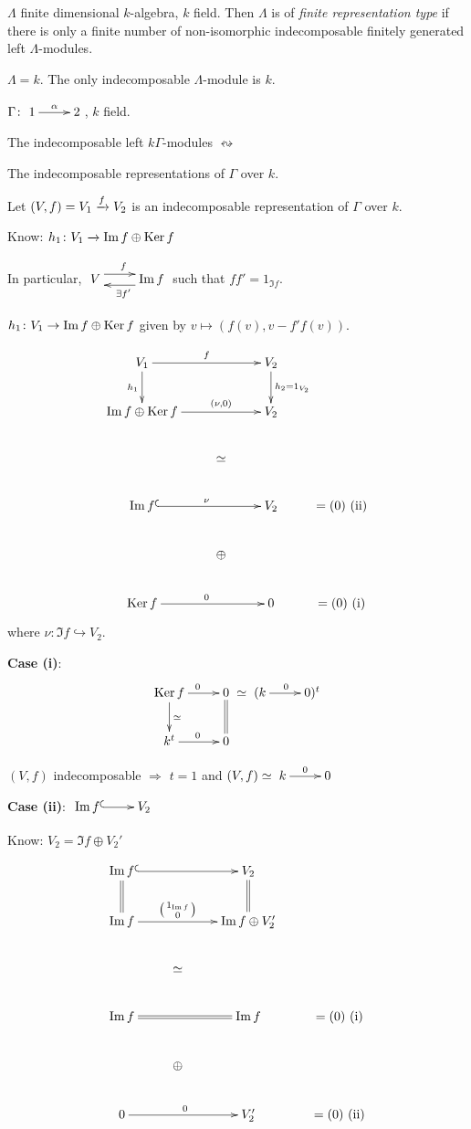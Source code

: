 \begin{defin}
$\Lambda$ finite dimensional $k$-algebra, $k$ field.  Then $\Lambda$
is of \emph{finite representation type} if there is only a finite number of non-isomorphic
indecomposable finitely generated left $\Lambda$-modules.
\end{defin}

\begin{exam}
$\Lambda = k$.  The only indecomposable $\Lambda$-module is $k$. 
\end{exam}

\begin{exam}
$\Gamma\colon \xymatrix{1\ar[r]^\alpha & 2}$, $k$ field.

The indecomposable left $k\Gamma$-modules $\leftrightsquigarrow$ \parbox{6cm}{The
indecomposable representations of $\Gamma$ over $k$.} 

Let $(V,f) = V_1\xrightarrow{f} V_2$ is an indecomposable representation of
$\Gamma$ over $k$.

Know: $h_1\colon V_1 \xrightarrow{~} \operatorname{Im}\nolimits f\oplus \operatorname{Ker}\nolimits f$

In particular, $\xymatrix{V\ar@<1ex>[r]^f & \Im f\ar@<1ex>[l]^{\exists
    f'}}$
such that $ff' = 1_{\Im f}$.

$h_1\colon V_1 \to \operatorname{Im}\nolimits f \oplus \operatorname{Ker}\nolimits f$ given by $v\mapsto (f(v), v -
f'f(v))$. 

\[\xymatrix{
V_1 \ar[rr]^f \ar[d]_{h_1} & &  V_2\ar[d]^{h_2=1_{V_2}} & \\
\Im f\oplus \Ker f \ar[rr]^-{(\nu,0)} & & V_2 & \\
& \simeq & & \\
\Im f\ar@{^(->}[rr]^\nu && V_2 & =(0) \text{\ (ii)}\\
 & \oplus & \\
\Ker f \ar[rr]^0 && 0 & = (0) \text{\ (i)}
}\]
where $\nu\colon \Im f \hookrightarrow V_2$.

\textbf{Case (i)}: \[\xymatrix{
\Ker f \ar[r]^0\ar[d]^\simeq & 0\ar@{=}[d]\\
k^t \ar[r]^0 & 0} \simeq \xymatrix{(k\ar[r]^0 & 0)^t}\]

$(V,f)$ indecomposable $\Rightarrow$ $t = 1$ and $(V,f)\simeq
\xymatrix{k\ar[r]^0 & 0}$ 

\textbf{Case (ii)}: $\xymatrix{\Im f \ar@{^(->}[r] & V_2}$

Know: $V_2 = \Im f\oplus V_2'$

\[\xymatrix{
\Im f \ar@{^(->}[rr] \ar@{=}[d] & &  V_2\ar@{=}[d] & \\
\Im f \ar[rr]^-{\left(\begin{smallmatrix}1_{\Im f} \\
      0\end{smallmatrix}\right)} & & 
\Im f \oplus V_2' & \\
& \simeq & & \\
\Im f\ar@{=}[rr] && \Im f & =(0) \text{\ (i)}\\
 & \oplus & \\
0\ar[rr]^0 && V'_2 & = (0) \text{\ (ii)}
}\]


\end{exam}
